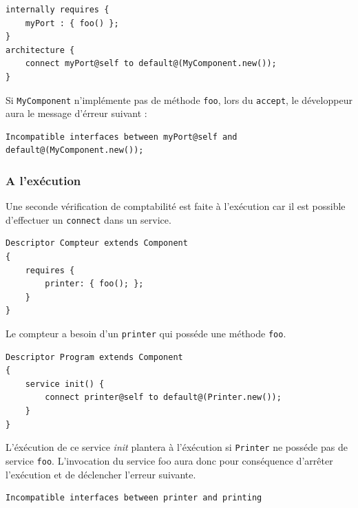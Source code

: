\documentclass[11pt,a4paper,openany,oneside]{book}
\begin{document}
\begin{lstlisting}[language=Compo, frame=single, caption=Exemple de connection incorrect]
internally requires {
    myPort : { foo() };
}
architecture {
    connect myPort@self to default@(MyComponent.new());
}
\end{lstlisting}

Si \texttt{MyComponent} n'implémente pas de méthode \texttt{foo}, lors du \texttt{accept}, le développeur aura le message d'érreur suivant : 

\begin{lstlisting}[language=Compo, frame=single, caption=Message d'erreur lorsque les interfaces sont incompatibles]
Incompatible interfaces between myPort@self and default@(MyComponent.new());
\end{lstlisting}

\subsubsection{A l'exécution}

Une seconde vérification de comptabilité est faite à l'exécution car il est possible d'effectuer un \texttt{connect} dans un service.

\begin{lstlisting}[language=Compo, frame=single, caption=Extrait d'un descripteur Compteur]
Descriptor Compteur extends Component
{
	requires {
		printer: { foo(); };
	}
}
\end{lstlisting}

Le compteur a besoin d'un \texttt{printer} qui posséde une méthode \texttt{foo}.


\begin{lstlisting}[language=Compo, frame=single, caption=Service qui lancera une exception lors de son invocation]
Descriptor Program extends Component
{
	service init() {
		connect printer@self to default@(Printer.new());
	}
}
\end{lstlisting}

L'éxécution de ce service \textit{init} plantera à l'éxécution si \texttt{Printer} ne posséde pas de service \texttt{foo}. L'invocation du service foo aura donc pour conséquence d'arrêter l'exécution et de déclencher l'erreur suivante.

\begin{lstlisting}[language=Compo, frame=single, caption=Message d'erreur lorsque les interfaces sont incompatibles]
Incompatible interfaces between printer and printing
\end{lstlisting}
\end{document}
